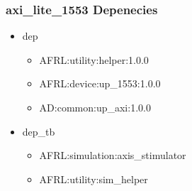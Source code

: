 \subsubsection{axi\_lite\_1553 Depenecies}
\begin{itemize}
\item dep
	\begin{itemize}
	\item AFRL:utility:helper:1.0.0
	\item AFRL:device:up\_1553:1.0.0
	\item AD:common:up\_axi:1.0.0
	\end{itemize}
\item dep\_tb
	\begin{itemize}
	\item AFRL:simulation:axis\_stimulator
	\item AFRL:utility:sim\_helper
	\end{itemize}
\end{itemize}
